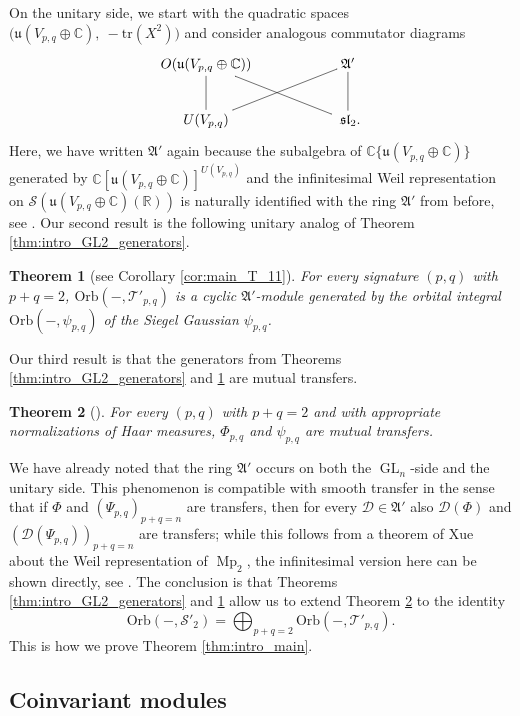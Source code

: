 \documentclass[reqno, 11pt]{amsart} %
\numberwithin{equation}{section}
\theoremstyle{plain}
\newtheorem{theorem}{Theorem}[section]
\theoremstyle{definition}
\theoremstyle{remark}
\newcommand{\tr}{\mathrm{tr}}
\newcommand{\mbC}{\mathbb{C}}
\newcommand{\mbR}{\mathbb{R}}
\newcommand{\mcD}{\mathcal{D}}
\newcommand{\mcS}{\mathcal{S}}
\newcommand{\mcT}{\mathcal{T}}
\newcommand{\mfA}{\mathfrak{A}}
\newcommand{\mfl}{\mathfrak{l}}
\newcommand{\mfs}{\mathfrak{s}}
\newcommand{\mfu}{\mathfrak{u}}
\newcommand{\mfsl}{\mfs\mfl}
\DeclareMathOperator{\GL}{GL}
\DeclareMathOperator{\Mp}{Mp}
\newcommand{\Orb}{\mathrm{Orb}}
\begin{document}
On the unitary side, we start with the quadratic spaces $\big(\mfu(V_{p,q}\oplus \mbC),\ -\tr(X^2)\big)$ and consider analogous commutator diagrams
\begin{equation}\label{eq:intro_seesaw_U}
\xymatrix{O(\mfu(V_{p,q}\oplus \mbC)) \ar@{-}[rrd] \ar@{-}[d] & & \mfA' \ar@{-}[d]\\
U(V_{p,q}) \ar@{-}[rru] & & \ \mfsl_2.}
\end{equation}
 Here, we have written $\mfA'$ again because the subalgebra of $\mbC\{\mfu(V_{p,q}\oplus \mbC)\}$ generated by $\mbC[\mfu(V_{p,q}\oplus \mbC)]^{U(V_{p,q})}$ and the infinitesimal Weil representation on $\mcS(\mfu(V_{p,q}\oplus \mbC)(\mbR))$ is naturally identified with the ring $\mfA'$ from before,  see . Our second result is the following unitary analog of Theorem \ref{thm:intro_GL2_generators}.
\begin{theorem}[see Corollary \ref{cor:main_T_11}]\label{thm:intro_U_generators}
For every signature $(p,q)$ with $p + q = 2$, $\Orb(-,\mcT'_{p,q})$ is a cyclic $\mfA'$-module generated by the orbital integral $\Orb(-,ψ_{p,q})$ of the Siegel Gaussian $ψ_{p,q}$.
\end{theorem}
Our third result is that the generators from Theorems \ref{thm:intro_GL2_generators} and \ref{thm:intro_U_generators} are mutual transfers.
\begin{theorem}[{}]\label{thm:intro_explicit_transfer}
For every $(p,q)$ with $p+q = 2$ and with appropriate normalizations of Haar measures, $Φ_{p,q}$ and $ψ_{p,q}$ are mutual transfers.
\end{theorem}
We have already noted that the ring $\mfA'$ occurs on both the $\GL_n$-side and the unitary side. This phenomenon is compatible with smooth transfer in the sense that if $\Phi$ and $(\Psi_{p,q})_{p+q=n}$ are transfers, then for every $\mcD \in \mfA'$ also $\mcD(Φ)$ and $(\mcD(Ψ_{p,q}))_{p+q=n}$ are transfers; while this follows from a theorem of Xue \cite[Theorem 9.1]{Xue} about the Weil representation of $\Mp_2$, the infinitesimal version here can be shown directly, see . The conclusion is that Theorems \ref{thm:intro_GL2_generators} and \ref{thm:intro_U_generators} allow us to extend Theorem \ref{thm:intro_explicit_transfer} to the identity
$$\Orb(-,\mcS'_2) = \bigoplus_{p+q = 2}\Orb(-,\mcT'_{p,q}).$$
This is how we prove Theorem \ref{thm:intro_main}.


\subsection{Coinvariant modules}
\end{document}

